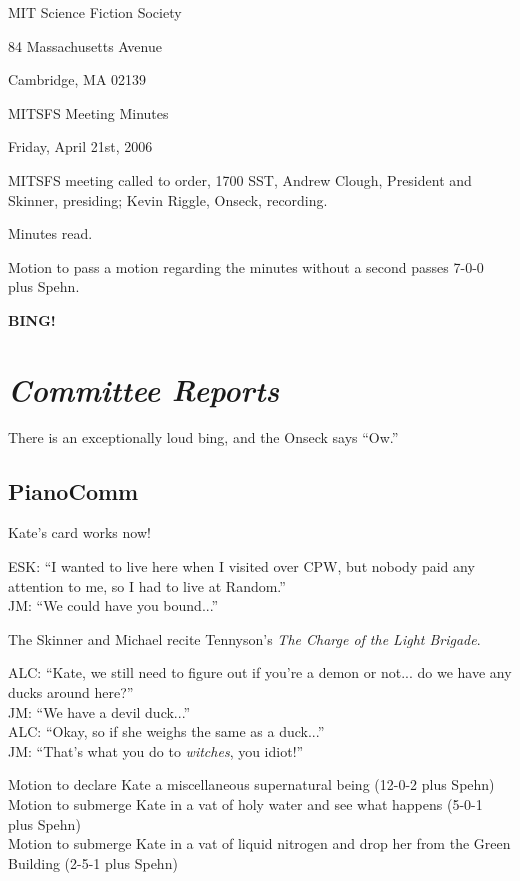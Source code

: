 \documentclass[10pt]{article}
\newcommand{\bing}{{\bf BING!} }
\newcommand{\goto}[1]{\bing \vskip 12pt \section*{{\em{#1}}}}
\newcommand{\ps}{ plus Spehn\xspace}
\begin{document}
\begin{center}

MIT Science Fiction Society

84 Massachusetts Avenue

Cambridge, MA 02139

\vspace{12pt}

MITSFS Meeting Minutes

Friday, April 21st, 2006

\end{center}

\vspace{18pt}

\setlength{\parskip}{6pt}

\noindent
MITSFS meeting called to order, 1700 SST,
Andrew Clough, President and Skinner, presiding; Kevin Riggle, Onseck, recording.

Minutes read.

Motion to pass a motion regarding the minutes without a second passes 7-0-0\ps.

\goto{Committee Reports}

There is an exceptionally loud bing, and the Onseck says ``Ow.''


\subsection*{PianoComm}
Kate's card works now!

ESK: ``I wanted to live here when I visited over CPW, but nobody paid any attention to me, so I had
to live at Random.''\\
JM: ``We could have you bound...''

The Skinner and Michael recite Tennyson's \emph{The Charge of the Light Brigade}.

ALC: ``Kate, we still need to figure out if you're a demon or not... do we have any ducks around
here?''\\
JM: ``We have a devil duck...''\\
ALC: ``Okay, so if she weighs the same as a duck...''\\
JM: ``That's what you do to \emph{witches}, you idiot!''

Motion to declare Kate a miscellaneous supernatural being (12-0-2\ps)\\
Motion to submerge Kate in a vat of holy water and see what happens (5-0-1\ps)\\
Motion to submerge Kate in a vat of liquid nitrogen and drop her from the Green Building (2-5-1\ps)\\
\end{document}
